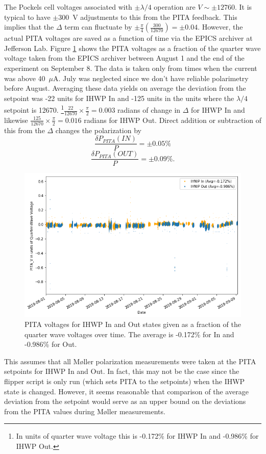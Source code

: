 \documentclass[12pt]{article}
\begin{document}
The Pockels cell voltages associated with $\pm\lambda/4$ operation are $V\sim\pm12760$. It is typical to have $\pm300$~V adjustments to this from the PITA feedback. This implies that the $\Delta$ term can fluctuate by $\pm\frac{\pi}{4}\left(\frac{300}{12670}\right)=\pm0.04$. However, the actual PITA voltages are saved as a function of time via the EPICS archiver at Jefferson Lab.  Figure \ref{fig:pitavst} shows the PITA voltages as a fraction of the quarter wave voltage taken from the EPICS archiver between August 1 and the end of the experiment on September 8. The data is taken only from times when the current was above 40~$\mu$A. July was neglected since we don't have reliable polarimetry before August. Averaging these data yields on average the deviation from the setpoint was -22 units for IHWP In and -125 units in the units where the $\lambda/4$ setpoint is 12670. \footnote{In units of quarter wave voltage this is -0.172\% for IHWP In and -0.986\% for IHWP Out.}$\frac{22}{12670}\times\frac{\pi}{2}=0.003$ radians of change in $\Delta$ for IHWP In and likewise $\frac{125}{12670}\times\frac{\pi}{2}=0.016$ radians for IHWP Out. Direct addition or subtraction of this from the $\Delta$ changes the polarization by 
\[
\frac{\delta P_{PITA}(IN)}{P}=\pm0.05\% 
\]
\[
\frac{\delta P_{PITA}(OUT)}{P}=\pm0.09\%.
\]
\begin{figure}
\centering
\includegraphics[width=1\textwidth]{pitavst.png}
\caption{\label{fig:pitavst}PITA voltages for IHWP In and Out states given as a fraction of the quarter wave voltages over time. The average is -0.172\% for In and -0.986\% for Out.}
\end{figure}
This assumes that all M\o ller polarization measurements were taken at the PITA setpoints for IHWP In and Out. In fact, this may not be the case since the flipper script is only run (which sets PITA to the setpoints) when the IHWP state is changed. However, it seems reasonable that comparison of the average deviation from the setpoint would serve as an upper bound on the deviations from the PITA values during M\o ller measurements.
\end{document}
